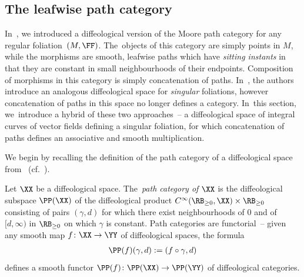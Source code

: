\subsection{The leafwise path category}

In~\cite{mac3}, we introduced a diffeological version of the Moore path category for any regular folia\-tion~$(M,\FF)$. The~objects of this category are simply points in $M$, while the morphisms are smooth, leafwise paths which have \textit{sitting instants} in that they are constant in small neighbourhoods of their endpoints. Composition of morphisms in this category is simply concatenation of paths. In~\cite{VilGar1}, the authors introduce an analogous diffeological space for \textit{singular} foliations, however concatenation of paths in this space no longer defines a category. In~this section, we~intro\-duce a hybrid of these two approaches~-- a diffeological space of integral curves of vector fields defining a singular foliation, for which concatenation of paths defines an associative and smooth multiplication.

We begin by recalling the definition of the path category of a diffeological space from~\cite{mac3} (cf.~\cite{ptfunctor}).

\begin{Definition}%
Let $\XX$ be a diffeological space. The~\textit{path category of $\XX$} is the diffeological sub\-space $\PP(\XX)$ of the diffeological product $C^{\infty}(\RB_{\geq0},\XX)\times\RB_{\geq0}$ consisting of pairs $(\gamma,d)$ for which there exist neighbourhoods of $0$ and of $[d,\infty)$ in $\RB_{\geq0}$ on which $\gamma$ is constant. Path categories are functorial~-- given any smooth map $f\colon \XX\rightarrow \YY$ of diffeological spaces, the formula
\begin{gather*}
\PP(f)(\gamma,d):=(f\circ\gamma,d)
\end{gather*}
defines a smooth functor $\PP(f)\colon \PP(\XX)\rightarrow \PP(\YY)$ of diffeological categories.
\end{Definition}


